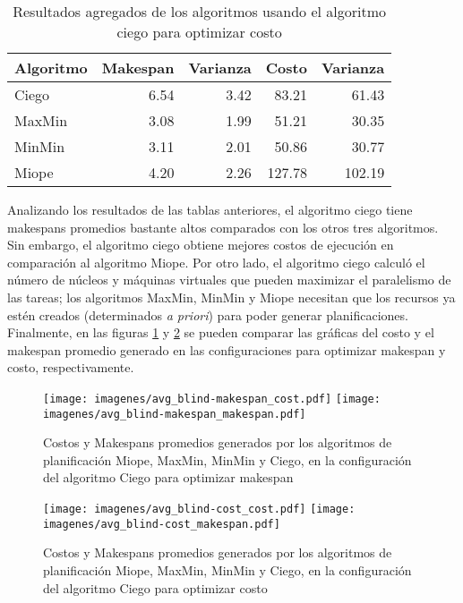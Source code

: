 \begin{table}[ht]
\centering
\begin{tabular}{lrrrr}
  \hline
Algoritmo & Makespan & Varianza & Costo & Varianza \\ 
  \hline
  Ciego & 6.54 & 3.42 & 83.21 & 61.43 \\ 
  MaxMin & 3.08 & 1.99 & 51.21 & 30.35 \\ 
  MinMin & 3.11 & 2.01 & 50.86 & 30.77 \\ 
  Miope & 4.20 & 2.26 & 127.78 & 102.19 \\ 
  \hline
\end{tabular}
\caption{Resultados agregados de los algoritmos usando el algoritmo ciego para optimizar costo} 
\label{table:results_cost}
\end{table}


Analizando los resultados de las tablas anteriores, el algoritmo ciego tiene makespans promedios bastante altos comparados con los otros tres algoritmos. Sin embargo, el algoritmo ciego obtiene mejores costos de ejecución en comparación al algoritmo Miope. Por otro lado, el algoritmo ciego calculó el número de núcleos y máquinas virtuales que pueden maximizar el paralelismo de las tareas; los algoritmos MaxMin, MinMin y Miope necesitan que los recursos ya estén creados (determinados \emph{a priori}) para poder generar planificaciones. Finalmente, en  las figuras \ref{fig:avg_blind_makespan} y \ref{fig:avg_blind_cost} se pueden comparar las gráficas del costo y el makespan promedio generado en las configuraciones para optimizar makespan y costo, respectivamente.


\begin{figure}
\begin{center}
\texttt{[image: imagenes/avg\_blind-makespan\_cost.pdf]}
\texttt{[image: imagenes/avg\_blind-makespan\_makespan.pdf]}
\end{center}
\caption{Costos y Makespans promedios generados por los algoritmos de planificación Miope, MaxMin, MinMin y Ciego, en la configuración del algoritmo Ciego para optimizar makespan}
\label{fig:avg_blind_makespan}
\end{figure}


\begin{figure}
\begin{center}
\texttt{[image: imagenes/avg\_blind-cost\_cost.pdf]}
\texttt{[image: imagenes/avg\_blind-cost\_makespan.pdf]}
\end{center}
\caption{Costos y Makespans promedios generados por los algoritmos de planificación Miope, MaxMin, MinMin y Ciego, en la configuración del algoritmo Ciego para optimizar costo}
\label{fig:avg_blind_cost}
\end{figure}
